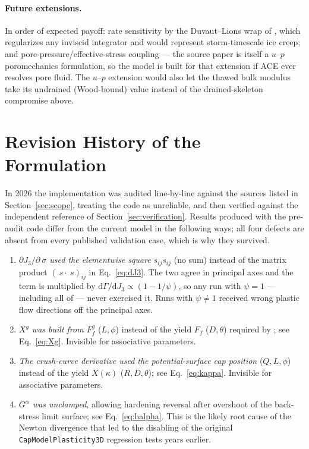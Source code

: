 \documentclass[12pt]{article}
\newcommand{\stress}{~\sigma}
\newcommand{\sdev}{~s}
\begin{document}
\paragraph{Future extensions.}
In order of expected payoff: rate sensitivity by the Duvaut--Lions
wrap of \citet{Regueiro.Foster:2011}, which regularizes any inviscid
integrator and would represent storm-timescale ice creep; and
pore-pressure/effective-stress coupling --- the source paper
\citet{Sun.Chen.Ostien:2014} is itself a $u$--$p$ poromechanics
formulation, so the model is built for that extension if ACE ever
resolves pore fluid. The $u$--$p$ extension would also let the
thawed bulk modulus take its undrained (Wood-bound) value instead of
the drained-skeleton compromise above.

\appendix

\section{Revision History of the Formulation}
\label{sec:history}

In 2026 the implementation was audited line-by-line against the
sources listed in Section~\ref{sec:scope}, treating the code as
unreliable, and then verified against the independent reference of
Section~\ref{sec:verification}. Results produced with the pre-audit
code differ from the current model in the following ways; all four
defects are absent from every published validation case, which is
why they survived.

\begin{enumerate}
\item \emph{$\partial J_3/\partial\stress$ used the elementwise
      square} $s_{ij} s_{ij}$ (no sum) instead of the matrix product
      $(\sdev\cdot\sdev)_{ij}$ in Eq.~\eqref{eq:dJ3}. The two agree
      in principal axes and the term is multiplied by
      $\mathrm{d}\Gamma/\mathrm{d}J_3 \propto (1 - 1/\psi)$, so any
      run with $\psi = 1$ --- including all of
      \citet{Sun.Chen.Ostien:2014} --- never exercised it. Runs with
      $\psi \ne 1$ received wrong plastic flow directions off the
      principal axes.
\item \emph{$X^g$ was built from $F_f^g$} ($L, \phi$) instead of the
      yield $F_f$ ($D, \theta$) required by
      \citet[Eq.~14]{Regueiro.Foster:2011}; see Eq.~\eqref{eq:Xg}.
      Invisible for associative parameters.
\item \emph{The crush-curve derivative used the potential-surface
      cap position} ($Q, L, \phi$) instead of the yield $X(\kappa)$
      ($R, D, \theta$); see Eq.~\eqref{eq:kappa}. Invisible for
      associative parameters.
\item \emph{$G^\alpha$ was unclamped}, allowing hardening reversal
      after overshoot of the back-stress limit surface; see
      Eq.~\eqref{eq:halpha}. This is the likely root cause of the
      Newton divergence that led to the disabling of the original
      \texttt{CapModelPlasticity3D} regression tests years earlier.
\end{enumerate}
\end{document}
